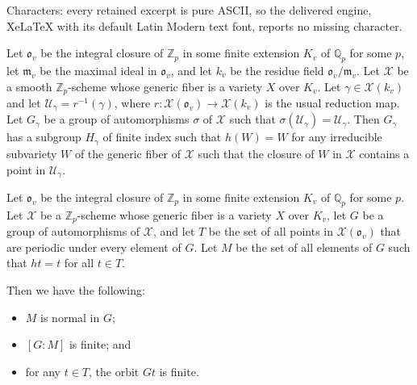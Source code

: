 \documentclass[10pt,a4paper]{amsart}
\newcommand{\bQ}{\mathbb{Q}}
\newcommand{\bZ} {\mathbb{Z}}
\newcommand{\cU}{\mathcal{U}}
\newcommand{\cX}{\mathcal X}
\newcommand{\fm}{\mathfrak m}
\newcommand{\fo}{\mathfrak o}
\newcommand{\lra}{\longrightarrow}
\begin{document}
Characters: every retained excerpt is pure ASCII, so the delivered engine, XeLaTeX with its default Latin Modern text font, reports no missing character.
\begin{lem}\label{basic}
  Let $\fo_v$ be the integral closure of $\bZ_p$ in some finite extension
  $K_v$ of $\bQ_p$ for some $p$, let $\fm_v$ be the maximal ideal in
  $\fo_v$, and let $k_v$ be the residue field $\fo_v/\fm_v$.  Let
  $\cX$ be a smooth $\bZ_p$-scheme whose generic fiber is a variety
  $X$ over $K_v$.  Let $\gamma \in \cX(k_v)$ and let
  $\cU_\gamma = r^{-1}(\gamma)$, where
  $r: \cX(\fo_v) \lra \cX(k_v)$ is the usual reduction map.   Let
  $G_\gamma$ be a group of automorphisms $\sigma$ of $\cX$ such
  that $\sigma(\cU_\gamma) = \cU_\gamma$.  Then $G_\gamma$ has a
  subgroup $H_\gamma$ of finite index such that $h(W) = W$ for any
  irreducible subvariety $W$ of the generic fiber of $\cX$ such that
  the closure of $W$ in $\cX$ contains a point in $\cU_\gamma$.     
\end{lem}

\begin{prop}\label{burn1}
Let $\fo_v$ be the integral closure of $\bZ_p$ in some finite extension
$K_v$ of $\bQ_p$ for some $p$.  Let $\cX$ be a $\bZ_p$-scheme
whose generic fiber is a variety $X$ over $K_v$, let $G$ be a group
of automorphisms of $\cX$, and let $T$ be the set
of all points in $\cX(\fo_v)$ that are periodic under every element of
$G$.  Let $M$ be the set of all elements of $G$ such that $ht = t$ for
all $t \in T$.  

Then we have the following:
\begin{itemize}
\item [(i)] $M$ is normal in $G$;
\item[(ii)] $[G:M]$ is finite; and
  \item [(iii)] for any $t \in T$, the orbit $Gt$ is finite. 
\end{itemize}
\end{prop}
\end{document}
